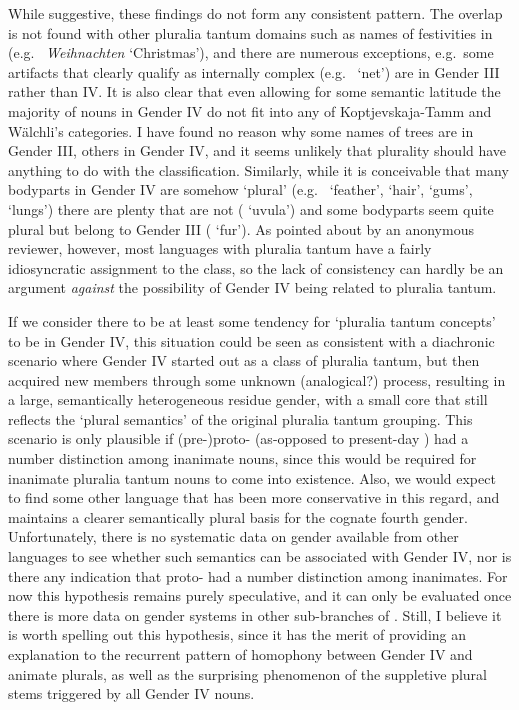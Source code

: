 \documentclass[output=collectionpaper]{langsci/langscibook}
\begin{document}
While suggestive, these findings do not form any consistent pattern. The overlap is not found with other pluralia tantum domains such as names of festivities in  (e.g.\  \emph{Weihnachten} `Christmas'), and there are numerous exceptions, e.g.\ some artifacts that clearly qualify as internally complex (e.g.\  `net') are in Gender III rather than IV. It is also clear that \textendash{} even allowing for some semantic latitude \textendash{} the majority of nouns in Gender IV do not fit into any of Koptjevskaja-Tamm and W\"alchli's categories. I have found no reason why some names of trees are in Gender III, others in Gender IV, and it seems unlikely that plurality should have anything to do with the classification. Similarly, while it is conceivable that many bodyparts in Gender IV are somehow `plural' (e.g.\  `feather',  `hair',  `gums',  `lungs') there are plenty that are not ( `uvula')
and some bodyparts seem quite plural but belong to Gender III ( `fur'). As pointed about by an anonymous reviewer, however, most languages with pluralia tantum have a fairly idiosyncratic assignment to the class, so the lack of consistency can hardly be an argument \emph{against} the possibility of Gender IV being related to pluralia tantum.

If we consider there to be at least some tendency for `pluralia tantum concepts' to be in Gender IV, this situation could be seen as consistent with a diachronic scenario where Gender IV started out as a class of pluralia tantum, but then acquired new members through some unknown (analogical?) process, resulting in a large, semantically heterogeneous residue gender, with a small core that still reflects the `plural semantics' of the original pluralia tantum grouping. This scenario is only plausible if (pre-)proto- (as-opposed to present-day ) had a number distinction among inanimate nouns, since this would be required for inanimate pluralia tantum nouns to come into existence. Also, we would expect to find some other  language that has been more conservative in this regard, and maintains a clearer semantically plural basis for the cognate fourth gender. Unfortunately, there is no systematic data on gender available from other  languages to see whether such semantics can be associated with Gender IV, nor is there any indication that proto- had a number distinction among inanimates. For now this hypothesis remains purely speculative, and it can only be evaluated once there is more data on gender systems in other sub-branches of . Still, I believe it is worth spelling out this hypothesis, since it has the merit of providing an explanation to the recurrent pattern of homophony between Gender IV and animate plurals, as well as the surprising phenomenon of the suppletive plural stems triggered by all Gender IV nouns.
\end{document}
